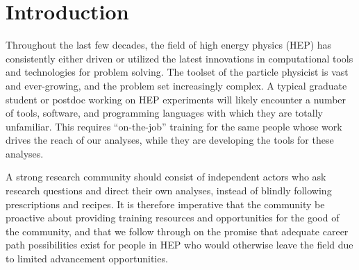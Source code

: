 %
%
%
%



\section{Introduction}

Throughout the last few decades, the field of high energy physics (HEP) has consistently either driven or utilized the latest innovations in computational tools and technologies for problem solving. 
The toolset of the particle physicist is vast and ever-growing, and the problem set increasingly complex.
A typical graduate student or postdoc working on HEP experiments will likely encounter a number of tools, software, and programming languages with which they are totally unfamiliar. 
This requires ``on-the-job'' training for the same people whose work drives the reach of our analyses, while they are developing the tools for these analyses.

A strong research community should consist of independent actors who ask research questions and direct their own analyses, instead of blindly following prescriptions and recipes. It is therefore imperative that the community be proactive about providing training resources and opportunities for the good of the community, and that we follow through on the promise that adequate career path possibilities exist for people in HEP who would otherwise leave the field due to limited advancement opportunities.

